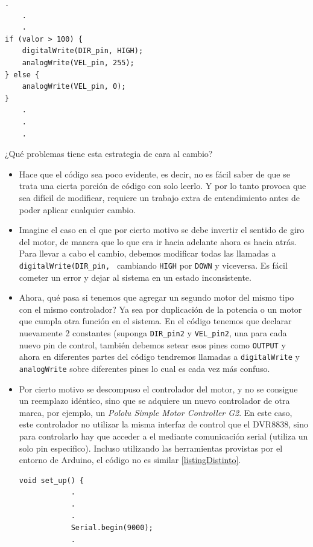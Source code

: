 \begin{lstlisting}[caption=Ejemplo uso del motor,label={listingMotor}]
    .
    .
    .
if (valor > 100) {
    digitalWrite(DIR_pin, HIGH);
    analogWrite(VEL_pin, 255);
} else {
    analogWrite(VEL_pin, 0);
}
    .
    .
    .
\end{lstlisting}

¿Qué problemas tiene esta estrategia de cara al cambio?
\begin{itemize}
    \item Hace que el código sea poco evidente, es decir, no es fácil saber de que se trata una cierta porción de código con solo leerlo. Y por lo tanto provoca que sea difícil de modificar, requiere un trabajo extra de entendimiento antes de poder aplicar cualquier cambio.
    \item Imagine el caso en el que por cierto motivo se debe invertir el sentido de giro del motor, de manera que lo que era ir hacia adelante ahora es hacia atrás. Para llevar a cabo el cambio, debemos modificar todas las llamadas a \verb|digitalWrite(DIR_pin, | cambiando \verb|HIGH| por \verb|DOWN| y viceversa. Es fácil cometer un error y dejar al sistema en un estado inconsistente.
    \item Ahora, qué pasa si tenemos que agregar un segundo motor del mismo tipo con el mismo controlador? Ya sea por duplicación de la potencia o un motor que cumpla otra función en el sistema. En el código tenemos que declarar nuevamente 2 constantes (suponga \verb|DIR_pin2| y \verb|VEL_pin2|, una para cada nuevo pin de control, también debemos setear esos pines como \verb|OUTPUT| y ahora en diferentes partes del código tendremos llamadas a \verb|digitalWrite| y \verb|analogWrite| sobre diferentes pines lo cual es cada vez más confuso.
    \item Por cierto motivo se descompuso el controlador del motor, y no se consigue un reemplazo idéntico, sino que se adquiere un nuevo controlador de otra marca, por ejemplo, un \textit{Pololu Simple Motor Controller G2}. En este caso, este controlador no utilizar la misma interfaz de control que el DVR8838, sino para controlarlo hay que acceder a el mediante comunicación serial (utiliza un solo pin especifico). Incluso utilizando las herramientas provistas por el entorno de Arduino, el código no es similar \ref{listingDistinto}.
    \begin{lstlisting}[caption=Configuración, label={listingDistinto}]
        void set_up() {
            .
            .
            .
            Serial.begin(9000);
            .

\end{lstlisting}
\end{itemize}
